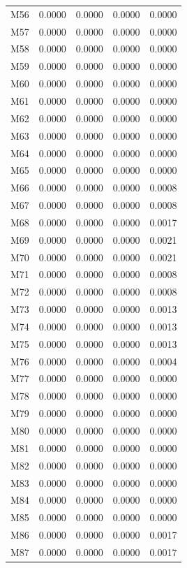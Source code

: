 \begin{longtable}{lrrrr}
M56 & 0.0000 & 0.0000 & 0.0000 & 0.0000 \\
M57 & 0.0000 & 0.0000 & 0.0000 & 0.0000 \\
M58 & 0.0000 & 0.0000 & 0.0000 & 0.0000 \\
M59 & 0.0000 & 0.0000 & 0.0000 & 0.0000 \\
M60 & 0.0000 & 0.0000 & 0.0000 & 0.0000 \\
M61 & 0.0000 & 0.0000 & 0.0000 & 0.0000 \\
M62 & 0.0000 & 0.0000 & 0.0000 & 0.0000 \\
M63 & 0.0000 & 0.0000 & 0.0000 & 0.0000 \\
M64 & 0.0000 & 0.0000 & 0.0000 & 0.0000 \\
M65 & 0.0000 & 0.0000 & 0.0000 & 0.0000 \\
M66 & 0.0000 & 0.0000 & 0.0000 & 0.0008 \\
M67 & 0.0000 & 0.0000 & 0.0000 & 0.0008 \\
M68 & 0.0000 & 0.0000 & 0.0000 & 0.0017 \\
M69 & 0.0000 & 0.0000 & 0.0000 & 0.0021 \\
M70 & 0.0000 & 0.0000 & 0.0000 & 0.0021 \\
M71 & 0.0000 & 0.0000 & 0.0000 & 0.0008 \\
M72 & 0.0000 & 0.0000 & 0.0000 & 0.0008 \\
M73 & 0.0000 & 0.0000 & 0.0000 & 0.0013 \\
M74 & 0.0000 & 0.0000 & 0.0000 & 0.0013 \\
M75 & 0.0000 & 0.0000 & 0.0000 & 0.0013 \\
M76 & 0.0000 & 0.0000 & 0.0000 & 0.0004 \\
M77 & 0.0000 & 0.0000 & 0.0000 & 0.0000 \\
M78 & 0.0000 & 0.0000 & 0.0000 & 0.0000 \\
M79 & 0.0000 & 0.0000 & 0.0000 & 0.0000 \\
M80 & 0.0000 & 0.0000 & 0.0000 & 0.0000 \\
M81 & 0.0000 & 0.0000 & 0.0000 & 0.0000 \\
M82 & 0.0000 & 0.0000 & 0.0000 & 0.0000 \\
M83 & 0.0000 & 0.0000 & 0.0000 & 0.0000 \\
M84 & 0.0000 & 0.0000 & 0.0000 & 0.0000 \\
M85 & 0.0000 & 0.0000 & 0.0000 & 0.0000 \\
M86 & 0.0000 & 0.0000 & 0.0000 & 0.0017 \\
M87 & 0.0000 & 0.0000 & 0.0000 & 0.0017 \\

\end{longtable}
